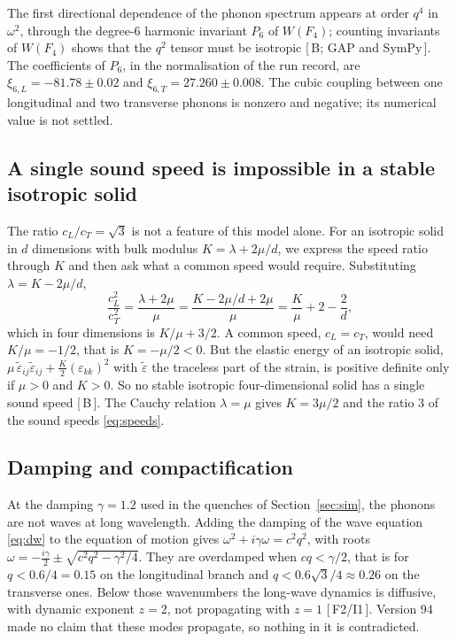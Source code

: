 \documentclass[a4paper,11pt]{article}
\numberwithin{equation}{section}
\theoremstyle{jsplain}
\theoremstyle{jsrem}
\newcommand{\grade}[1]{[\,#1\,]}
\begin{document}
The first directional dependence of the phonon spectrum appears at order $q^4$ in $\omega^2$, through the degree-6 harmonic invariant $P_6$ of $W(F_4)$; counting invariants of $W(F_4)$ shows that the $q^2$ tensor must be isotropic \grade{B; GAP and SymPy}. The coefficients of $P_6$, in the normalisation of the run record, are $\xi_{6,L}=-81.78\pm0.02$ and $\xi_{6,T}=27.260\pm0.008$. The cubic coupling between one longitudinal and two transverse phonons is nonzero and negative; its numerical value is not settled.

\subsection{A single sound speed is impossible in a stable isotropic solid}

The ratio $c_L/c_T=\sqrt3$ is not a feature of this model alone. For an isotropic solid in $d$ dimensions with bulk modulus $K=\lambda+2\mu/d$, we express the speed ratio through $K$ and then ask what a common speed would require. Substituting $\lambda=K-2\mu/d$,
\[
\frac{c_L^2}{c_T^2}=\frac{\lambda+2\mu}{\mu}=\frac{K-2\mu/d+2\mu}{\mu}=\frac K\mu+2-\frac2d,
\]
which in four dimensions is $K/\mu+3/2$. A common speed, $c_L=c_T$, would need $K/\mu=-1/2$, that is $K=-\mu/2<0$. But the elastic energy of an isotropic solid, $\mu\,\tilde\varepsilon_{ij}\tilde\varepsilon_{ij}+\tfrac K2(\varepsilon_{kk})^2$ with $\tilde\varepsilon$ the traceless part of the strain, is positive definite only if $\mu>0$ and $K>0$. So no stable isotropic four-dimensional solid has a single sound speed \grade{B}. The Cauchy relation $\lambda=\mu$ gives $K=3\mu/2$ and the ratio $3$ of the sound speeds \eqref{eq:speeds}.

\subsection{Damping and compactification}

At the damping $\gamma=1.2$ used in the quenches of Section~\ref{sec:sim}, the phonons are not waves at long wavelength. Adding the damping of the wave equation \eqref{eq:dw} to the equation of motion gives $\omega^2+i\gamma\omega=c^2q^2$, with roots $\omega=-\tfrac{i\gamma}2\pm\sqrt{c^2q^2-\gamma^2/4}$. They are overdamped when $cq<\gamma/2$, that is for $q<0.6/4=0.15$ on the longitudinal branch and $q<0.6\sqrt3/4\approx0.26$ on the transverse ones. Below those wavenumbers the long-wave dynamics is diffusive, with dynamic exponent $z=2$, not propagating with $z=1$ \grade{F2/I1}. Version 94 made no claim that these modes propagate, so nothing in it is contradicted.
\end{document}
